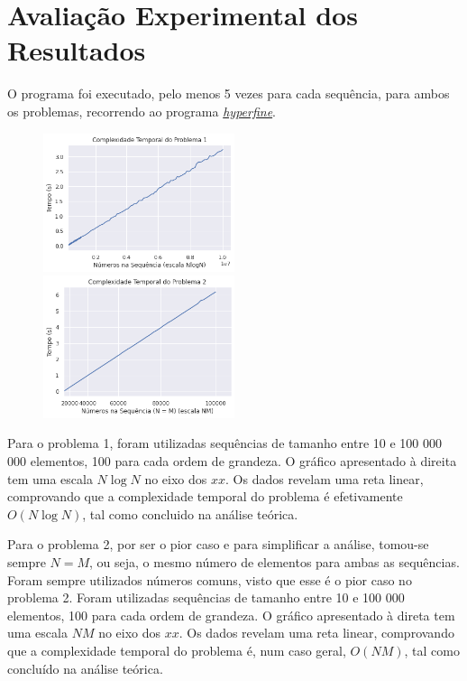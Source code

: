 \documentclass[12pt,a4paper]{article}
\begin{document}
  \section{Avaliação Experimental dos Resultados}

  O programa foi executado, pelo menos 5 vezes para cada sequência, para ambos os problemas, recorrendo ao programa \href{https://github.com/sharkdp/hyperfine}{\textit{hyperfine}}.

  \begin{figure}
    \centering
    \includegraphics[width=0.5\textwidth]{report_prob1.png}
    \includegraphics[width=0.5\textwidth]{report_prob2.png}
  \end{figure}

  Para o problema 1, foram utilizadas sequências de tamanho entre 10 e 100 000 000 elementos, 100 para cada ordem de grandeza.
  O gráfico apresentado à direita tem uma escala $N \log N$ no eixo dos $xx$.
  Os dados revelam uma reta linear, comprovando que a complexidade temporal do problema é efetivamente $O(N\log N)$, tal como concluido na análise teórica.

  Para o problema 2, por ser o pior caso e para simplificar a análise, tomou-se sempre $N = M$, ou seja, o mesmo número de elementos para ambas as sequências.
  Foram sempre utilizados números comuns, visto que esse é o pior caso no problema 2.
  Foram utilizadas sequências de tamanho entre 10 e 100 000 elementos, 100 para cada ordem de grandeza.
  O gráfico apresentado à direta tem uma escala $NM$ no eixo dos $xx$.
  Os dados revelam uma reta linear, comprovando que a complexidade temporal do problema é, num caso geral, $O(NM)$, tal como concluído na análise teórica.
\end{document}
